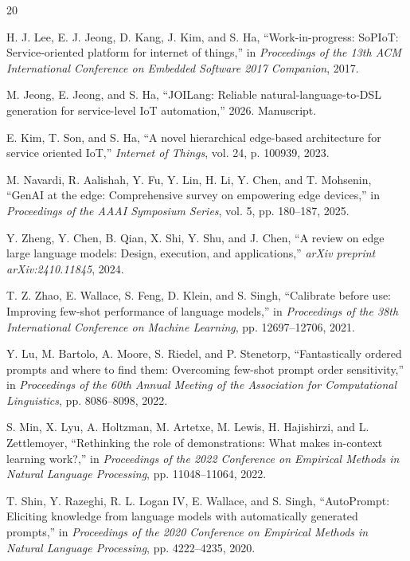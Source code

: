 \documentclass[10pt,twocolumn]{article}
\begin{document}
\begin{thebibliography}{20}
\footnotesize

H. J. Lee, E. J. Jeong, D. Kang, J. Kim, and S. Ha,
``Work-in-progress: SoPIoT: Service-oriented platform for internet of things,''
in \emph{Proceedings of the 13th ACM International Conference on Embedded Software 2017 Companion}, 2017.

M. Jeong, E. Jeong, and S. Ha,
``JOILang: Reliable natural-language-to-DSL generation for service-level IoT automation,'' 2026. Manuscript.

E. Kim, T. Son, and S. Ha,
``A novel hierarchical edge-based architecture for service oriented IoT,''
\emph{Internet of Things}, vol. 24, p. 100939, 2023.

M. Navardi, R. Aalishah, Y. Fu, Y. Lin, H. Li, Y. Chen, and T. Mohsenin,
``GenAI at the edge: Comprehensive survey on empowering edge devices,''
in \emph{Proceedings of the AAAI Symposium Series}, vol. 5, pp. 180--187, 2025.

Y. Zheng, Y. Chen, B. Qian, X. Shi, Y. Shu, and J. Chen,
``A review on edge large language models: Design, execution, and applications,''
\emph{arXiv preprint arXiv:2410.11845}, 2024.

T. Z. Zhao, E. Wallace, S. Feng, D. Klein, and S. Singh,
``Calibrate before use: Improving few-shot performance of language models,''
in \emph{Proceedings of the 38th International Conference on Machine Learning}, pp. 12697--12706, 2021.

Y. Lu, M. Bartolo, A. Moore, S. Riedel, and P. Stenetorp,
``Fantastically ordered prompts and where to find them: Overcoming few-shot prompt order sensitivity,''
in \emph{Proceedings of the 60th Annual Meeting of the Association for Computational Linguistics}, pp. 8086--8098, 2022.

S. Min, X. Lyu, A. Holtzman, M. Artetxe, M. Lewis, H. Hajishirzi, and L. Zettlemoyer,
``Rethinking the role of demonstrations: What makes in-context learning work?,''
in \emph{Proceedings of the 2022 Conference on Empirical Methods in Natural Language Processing}, pp. 11048--11064, 2022.

T. Shin, Y. Razeghi, R. L. Logan IV, E. Wallace, and S. Singh,
``AutoPrompt: Eliciting knowledge from language models with automatically generated prompts,''
in \emph{Proceedings of the 2020 Conference on Empirical Methods in Natural Language Processing}, pp. 4222--4235, 2020.


\end{thebibliography}
\end{document}
